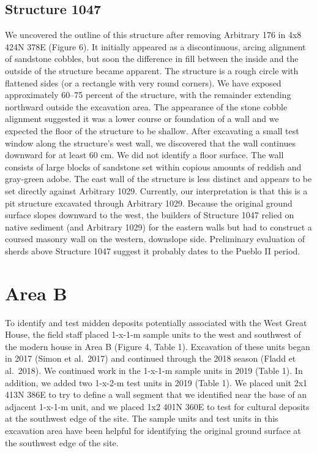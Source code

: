 \documentclass[
  12pt,
]{krantz}
\begin{document}
\hypertarget{structure-1047}{%
\subsection{Structure 1047}\label{structure-1047}}

We uncovered the outline of this structure after removing Arbitrary 176
in 4x8 424N 378E (Figure 6). It initially appeared as a discontinuous,
arcing alignment of sandstone cobbles, but soon the difference in fill
between the inside and the outside of the structure became apparent. The
structure is a rough circle with flattened sides (or a rectangle with
very round corners). We have exposed approximately 60--75 percent of the
structure, with the remainder extending northward outside the excavation
area. The appearance of the stone cobble alignment suggested it was a
lower course or foundation of a wall and we expected the floor of the
structure to be shallow. After excavating a small test window along the
structure's west wall, we discovered that the wall continues downward
for at least 60 cm. We did not identify a floor surface. The wall
consists of large blocks of sandstone set within copious amounts of
reddish and gray-green adobe. The east wall of the structure is less
distinct and appears to be set directly against Arbitrary 1029.
Currently, our interpretation is that this is a pit structure excavated
through Arbitrary 1029. Because the original ground surface slopes
downward to the west, the builders of Structure 1047 relied on native
sediment (and Arbitrary 1029) for the eastern walls but had to construct
a coursed masonry wall on the western, downslope side. Preliminary
evaluation of sherds above Structure 1047 suggest it probably dates to
the Pueblo II period.

\hypertarget{area-b}{%
\section{Area B}\label{area-b}}

To identify and test midden deposits potentially associated with the
West Great House, the field staff placed 1-x-1-m sample units to the
west and southwest of the modern house in Area B (Figure 4, Table 1).
Excavation of these units began in 2017 (Simon et al.~2017) and
continued through the 2018 season (Fladd et al.~2018). We continued work
in the 1-x-1-m sample units in 2019 (Table 1). In addition, we added two
1-x-2-m test units in 2019 (Table 1). We placed unit 2x1 413N 386E to
try to define a wall segment that we identified near the base of an
adjacent 1-x-1-m unit, and we placed 1x2 401N 360E to test for cultural
deposits at the southwest edge of the site. The sample units and test
units in this excavation area have been helpful for identifying the
original ground surface at the southwest edge of the site.
\end{document}
